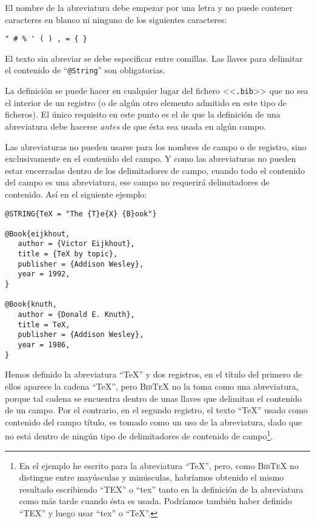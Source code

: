 \documentclass[a4paper,11pt]{article}
\def\btx-{\textsc{Bib\TeX}}
\def\ltr#1-{<<\texttt{#1}>>}
\def\tpf#1-{\ltr.#1-}
\begin{document}
El nombre  de la abreviatura  debe empezar por  una letra y no  puede contener
caracteres en blanco ni ninguno de los siguientes caracteres:

\verb|" # % ' ( ) , = { }|

El texto  sin abreviar  se debe especificar  entre comillas.  Las  llaves para
delimitar el contenido de ``\texttt{@String}'' son obligatorias.

La definición se  puede hacer en cualquier lugar del fichero  \tpf bib- que no
sea el interior de un registro (o de algún otro elemento admitido en este tipo
de ficheros). El único  requisito en este punto es el de  que la definición de
una  abreviatura debe  hacerse \emph{antes}  de que  ésta sea  usada  en algún
campo.

Las abreviaturas  no pueden usarse  para los nombres  de campo o  de registro,
sino  exclusivamente en el  contenido del  campo. Y  como las  abreviaturas no
pueden estar encerradas  dentro de los delimitadores de  campo, cuando todo el
contenido del campo  es una abreviatura, ese campo  no requerirá delimitadores
de contenido. Así en el siguiente ejemplo:

{\small
\begin{verbatim}
@STRING{TeX = "The {T}e{X} {B}ook"}

@Book{eijkhout,
   author = {Victor Eijkhout},
   title = {TeX by topic},
   publisher = {Addison Wesley},
   year = 1992,
}

@Book{knuth,
   author = {Donald E. Knuth},
   title = TeX,
   publisher = {Addison Wesley},
   year = 1986,
}
\end{verbatim}
}

\noindent Hemos definido la abreviatura  ``TeX'' y dos registros, en el título
del primero de ellos aparece la cadena ``TeX'', pero \btx- no la toma como una
abreviatura,  porque  tal  cadena  se  encuentra dentro  de  unas  llaves  que
delimitan el contenido de un campo.  Por el contrario, en el segundo registro,
el texto ``TeX'' usado como contenido  del campo título, es tomado como un uso
de la abreviatura, dado que no  está dentro de ningún tipo de delimitadores de
contenido  de campo\footnote{En  el  ejemplo he  escrito  para la  abreviatura
  ``TeX'',  pero,  como \btx-  no  distingue  entre  mayúsculas y  minúsculas,
  habríamos obtenido el mismo resultado escribiendo ``TEX'' o ``tex'' tanto en
  la  definición  de la  abreviatura  como más  tarde  cuando  ésta es  usada.
  Podríamos también haber definido ``TEX'' y luego usar ``tex'' o ``TeX''.  }.
\end{document}
